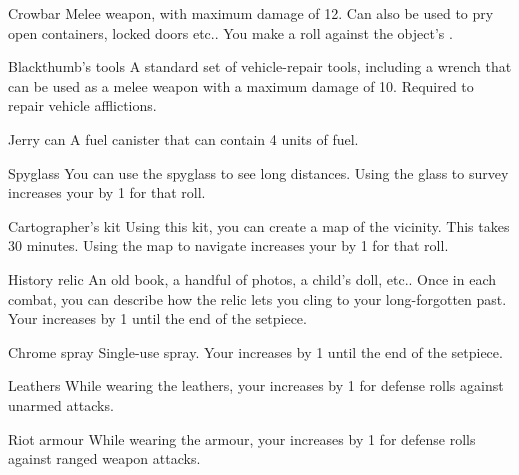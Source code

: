 \hr

\begin{describe}{Crowbar}
  Melee weapon, with maximum damage of 12. Can also be used to pry open containers, locked doors etc.. You make a  roll against the object's .
\end{describe}

\begin{describe}{Blackthumb's tools}
  A standard set of vehicle-repair tools, including a wrench that can be used as a melee weapon with a maximum damage of 10. Required to repair vehicle afflictions.
\end{describe}

\begin{describe}{Jerry can}
  A fuel canister that can contain 4 units of fuel.
\end{describe}

\begin{describe}{Spyglass}
  You can use the spyglass to see long distances. Using the glass to survey increases your  by 1 for that roll.
\end{describe}

\begin{describe}{Cartographer's kit}
  Using this kit, you can create a map of the vicinity. This takes 30 minutes. Using the map to navigate increases your  by 1 for that roll.
\end{describe}

\begin{describe}{History relic}
  An old book, a handful of photos, a child's doll, etc.. Once in each combat, you can describe how the relic lets you cling to your long-forgotten past. Your  increases by 1 until the end of the setpiece.
\end{describe}

\begin{describe}{Chrome spray}
  Single-use spray. Your  increases by 1 until the end of the setpiece.
\end{describe}

\hr

\begin{describe}{Leathers}
  While wearing the leathers, your  increases by 1 for defense rolls against unarmed attacks.
\end{describe}

\begin{describe}{Riot armour}
  While wearing the armour, your  increases by 1 for defense rolls against ranged weapon attacks.
\end{describe}
